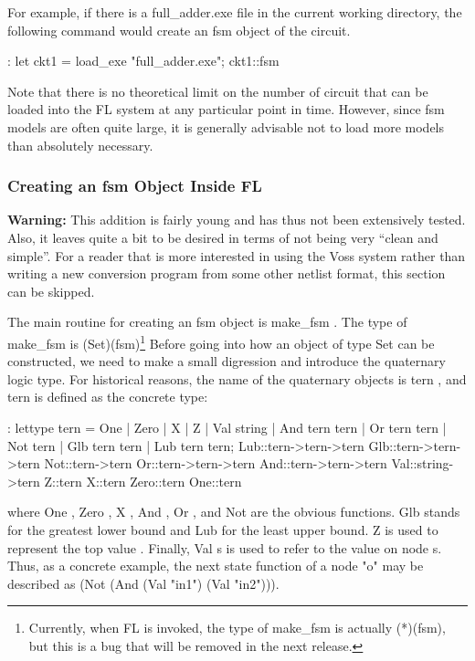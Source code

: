 For example, if there is a full\_adder.exe file in the current
working directory, the following command would create an fsm object
of the circuit.
\begin{hol}
: let ckt1 = load\_exe "full\_adder.exe";
ckt1::fsm
\end{hol}
Note that there is no theoretical limit on the number of circuit that can
be loaded into the FL system at any particular point in time.
However, since fsm models are often quite large, it is generally
advisable not to load more models than absolutely necessary.

\subsubsection{Creating an fsm Object Inside FL}
\label{makeSTEsection}

{\bf Warning:} This addition is fairly young and has thus not
been extensively tested. Also, it leaves quite a bit to
be desired in terms of not being very ``clean and simple''.
For a reader that is more interested in using the Voss system rather
than writing a new conversion program from some other netlist format, this
section can be skipped.

The main routine for creating an fsm object is make\_fsm%
%
{}.
The type of make\_fsm is (Set)\funarrow (fsm)\footnote{Currently, when
FL is invoked, the type of make\_fsm is actually (*)\funarrow (fsm), but
this is a bug that will be removed in the next release.}
Before going into how an object of type Set%
%
{} can be constructed, we
need to make a small digression and introduce the quaternary logic type.
For historical reasons, the name of the quaternary objects is tern%
%
{},
and tern is defined as the concrete type:
\begin{hol}
: lettype tern =  One |
                Zero |
                X |
                Z |
                Val string |
                And tern tern |
                Or tern tern |
                Not tern |
                Glb tern tern |
                Lub tern tern;
Lub::tern->tern->tern
Glb::tern->tern->tern
Not::tern->tern
Or::tern->tern->tern
And::tern->tern->tern
Val::string->tern
Z::tern
X::tern
Zero::tern
One::tern
\end{hol}
where One%
%
{}, Zero%
%
{}, X%
%
{},  And%
%
{}, Or%
%
{}, and Not%
%
{} are the obvious functions.
Glb%
%
{} stands for the greatest lower bound and Lub%
%
{} for the least upper bound.
Z%
%
{} is used to represent the top value%
%
{}.
Finally, Val%
%
{} s is used to refer to the value on node s.
Thus, as a concrete example, the next state function of a node "o" may
be described as (Not (And (Val "in1") (Val "in2"))).

